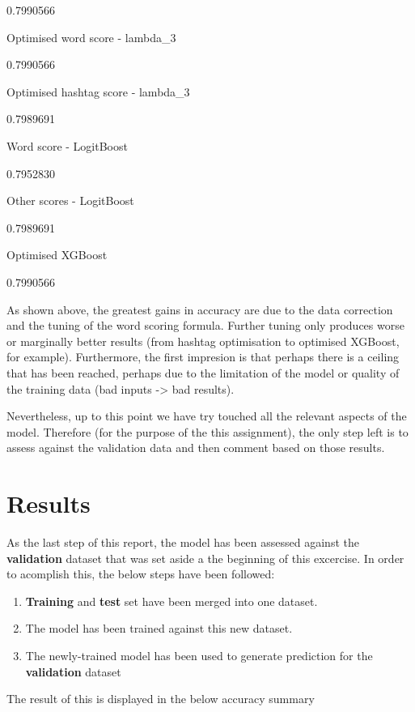 \documentclass[11pt,]{article}
\providecommand{\tightlist}{%
  \setlength{\itemsep}{0pt}\setlength{\parskip}{0pt}}
\begin{document}
0.7990566

Optimised word score - lambda\_3

0.7990566

Optimised hashtag score - lambda\_3

0.7989691

Word score - LogitBoost

0.7952830

Other scores - LogitBoost

0.7989691

Optimised XGBoost

0.7990566

As shown above, the greatest gains in accuracy are due to the data
correction and the tuning of the word scoring formula. Further tuning
only produces worse or marginally better results (from hashtag
optimisation to optimised XGBoost, for example). Furthermore, the first
impresion is that perhaps there is a ceiling that has been reached,
perhaps due to the limitation of the model or quality of the training
data (bad inputs -\textgreater{} bad results).

Nevertheless, up to this point we have try touched all the relevant
aspects of the model. Therefore (for the purpose of the this
assignment), the only step left is to assess against the validation data
and then comment based on those results.

\hypertarget{results}{%
\section{Results}\label{results}}

As the last step of this report, the model has been assessed against the
\textbf{validation} dataset that was set aside a the beginning of this
excercise. In order to acomplish this, the below steps have been
followed:

\begin{enumerate}
\def\labelenumi{\arabic{enumi}.}
\tightlist
\item
  \textbf{Training} and \textbf{test} set have been merged into one
  dataset.
\item
  The model has been trained against this new dataset.
\item
  The newly-trained model has been used to generate prediction for the
  \textbf{validation} dataset
\end{enumerate}

The result of this is displayed in the below accuracy summary
\end{document}
